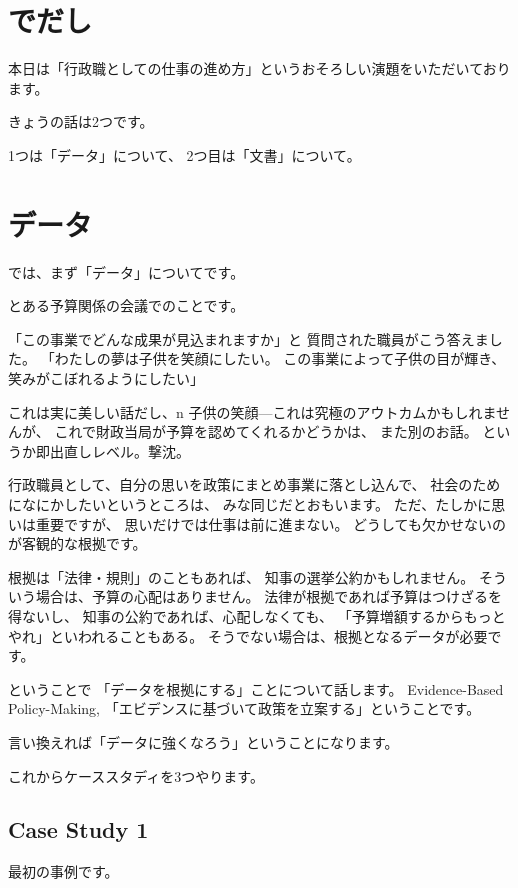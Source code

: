 \documentclass[uplatex,jis2004,dvipdfmx,12pt]{jsarticle}
\begin{document}
\section{でだし}
本日は「行政職としての仕事の進め方」というおそろしい演題をいただいております。

きょうの話は2つです。

1つは「データ」について、
2つ目は「文書」について。


\section{データ}
では、まず「データ」についてです。

とある予算関係の会議でのことです。

「この事業でどんな成果が見込まれますか」と
質問された職員がこう答えました。
「わたしの夢は子供を笑顔にしたい。
この事業によって子供の目が輝き、
笑みがこぼれるようにしたい」

これは実に美しい話だし、n
子供の笑顔---これは究極のアウトカムかもしれませんが、
これで財政当局が予算を認めてくれるかどうかは、
また別のお話。
というか即出直しレベル。撃沈。

行政職員として、自分の思いを政策にまとめ事業に落とし込んで、
社会のためになにかしたいというところは、
みな同じだとおもいます。
ただ、たしかに思いは重要ですが、
思いだけでは仕事は前に進まない。
どうしても欠かせないのが客観的な根拠です。

根拠は「法律・規則」のこともあれば、
知事の選挙公約かもしれません。
そういう場合は、予算の心配はありません。
法律が根拠であれば予算はつけざるを得ないし、
知事の公約であれば、心配しなくても、
「予算増額するからもっとやれ」といわれることもある。
そうでない場合は、根拠となるデータが必要です。

ということで
「データを根拠にする」ことについて話します。
Evidence-Based Policy-Making,
「エビデンスに基づいて政策を立案する」ということです。

言い換えれば「データに強くなろう」ということになります。

これからケーススタディを3つやります。

\subsection{Case Study 1}
最初の事例です。
\end{document}

